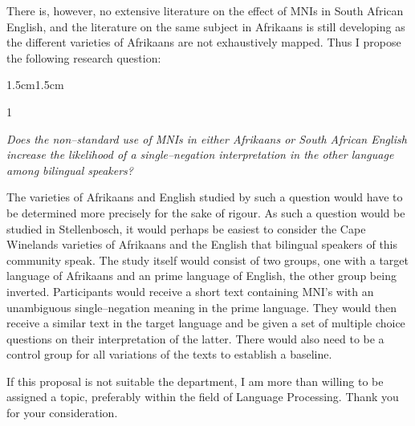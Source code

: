 \documentclass[12pt,a4paper]{article}
\begin{document}
There is, however, no extensive literature on the effect of MNIs in South African English, and the literature on the same subject in Afrikaans is still developing as the different varieties of Afrikaans are not exhaustively mapped. Thus I propose the following research question:
\begin{adjustwidth}{1.5cm}{1.5cm}
    \begin{spacing}{1}
        \begin{center}
            \small
                \textit{Does the non–standard use of MNIs in either Afrikaans or South African English increase the likelihood of a single–negation interpretation in the other language among bilingual speakers?}
        \end{center}
    \end{spacing}
\end{adjustwidth}
The varieties of Afrikaans and English studied by such a question would have to be determined more precisely for the sake of rigour. As such a question would be studied in Stellenbosch, it would perhaps be easiest to consider the Cape Winelands varieties of Afrikaans and the English that bilingual speakers of this community speak. The study itself would consist of two groups, one with a target language of Afrikaans and an prime language of English, the other group being inverted. Participants would receive a short text containing MNI's with an unambiguous single–negation meaning in the prime language. They would then receive a similar text in the target language and be given a set of multiple choice questions on their interpretation of the latter. There would also need to be a control group for all variations of the texts to establish a baseline.\par

If this proposal is not suitable the department, I am more than willing to be assigned a topic, preferably within the field of Language Processing. Thank you for your consideration.
    
\end{document}
